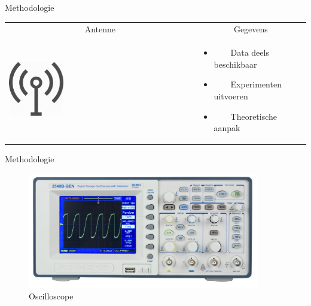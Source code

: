 \documentclass[presentation, bigger]{beamer}
\newcommand{\tabitem}{~~\llap{\textbullet}~~}
\begin{document}
\begin{frame}{Methodologie}
 
     \begin{tabular}{ p{}  p{}   }
     \toprule
      \multicolumn{1}{c}{Antenne} &      \multicolumn{1}{c}{Gegevens}  \\ 
    \cmidrule(r){1-1}\cmidrule(lr){2-2}
     \raisebox{-\totalheight}
{\includegraphics[width=0.3\textwidth,keepaspectration=true]{radio}}
      & 
      \begin{itemize}
      \item \tabitem Data deels beschikbaar
      \item \tabitem Experimenten uitvoeren
      \item \tabitem Theoretische aanpak
      \end{itemize}
      \\ 
      
      \end{tabular}
     
\end{frame}


\begin{frame}{Methodologie}
  \begin{figure}[center]
    \centering
    \includegraphics[width=0.9\textwidth,keepaspectration=true]{elek/dso}
    \caption{Oscilloscope}
  \end{figure}
\end{frame}
\end{document}
